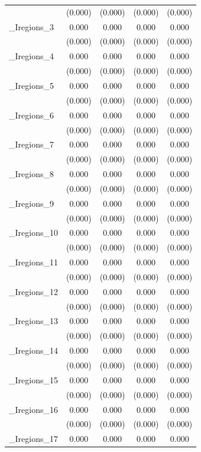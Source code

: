 \documentclass[]{article}
\begin{document}
\begin{tabular}{lcccc}
 & (0.000) & (0.000) & (0.000) & (0.000) \\
\_Iregions\_3 & 0.000 & 0.000 & 0.000 & 0.000 \\
 & (0.000) & (0.000) & (0.000) & (0.000) \\
\_Iregions\_4 & 0.000 & 0.000 & 0.000 & 0.000 \\
 & (0.000) & (0.000) & (0.000) & (0.000) \\
\_Iregions\_5 & 0.000 & 0.000 & 0.000 & 0.000 \\
 & (0.000) & (0.000) & (0.000) & (0.000) \\
\_Iregions\_6 & 0.000 & 0.000 & 0.000 & 0.000 \\
 & (0.000) & (0.000) & (0.000) & (0.000) \\
\_Iregions\_7 & 0.000 & 0.000 & 0.000 & 0.000 \\
 & (0.000) & (0.000) & (0.000) & (0.000) \\
\_Iregions\_8 & 0.000 & 0.000 & 0.000 & 0.000 \\
 & (0.000) & (0.000) & (0.000) & (0.000) \\
\_Iregions\_9 & 0.000 & 0.000 & 0.000 & 0.000 \\
 & (0.000) & (0.000) & (0.000) & (0.000) \\
\_Iregions\_10 & 0.000 & 0.000 & 0.000 & 0.000 \\
 & (0.000) & (0.000) & (0.000) & (0.000) \\
\_Iregions\_11 & 0.000 & 0.000 & 0.000 & 0.000 \\
 & (0.000) & (0.000) & (0.000) & (0.000) \\
\_Iregions\_12 & 0.000 & 0.000 & 0.000 & 0.000 \\
 & (0.000) & (0.000) & (0.000) & (0.000) \\
\_Iregions\_13 & 0.000 & 0.000 & 0.000 & 0.000 \\
 & (0.000) & (0.000) & (0.000) & (0.000) \\
\_Iregions\_14 & 0.000 & 0.000 & 0.000 & 0.000 \\
 & (0.000) & (0.000) & (0.000) & (0.000) \\
\_Iregions\_15 & 0.000 & 0.000 & 0.000 & 0.000 \\
 & (0.000) & (0.000) & (0.000) & (0.000) \\
\_Iregions\_16 & 0.000 & 0.000 & 0.000 & 0.000 \\
 & (0.000) & (0.000) & (0.000) & (0.000) \\
\_Iregions\_17 & 0.000 & 0.000 & 0.000 & 0.000 \\

\end{tabular}
\end{document}
